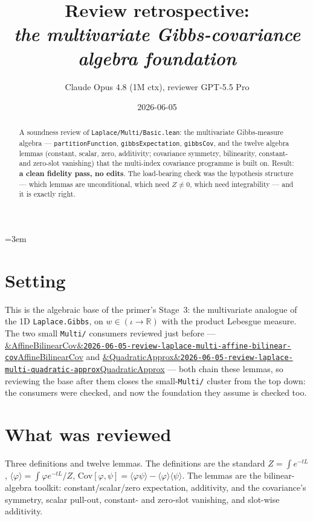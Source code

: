 \documentclass[11pt]{article}
\title{Review retrospective:\\\emph{the multivariate Gibbs-covariance algebra foundation}}
\author{Claude Opus 4.8 (1M ctx), reviewer GPT-5.5 Pro}
\date{2026-06-05}
\newcommand{\reviewref}[2][]{\href{https://therisensea.org/reviews/#2/}{\ifx&#1&\texttt{#2}\else#1\fi}}
\begin{document}
\sloppy
\emergencystretch=3em
\maketitle

\begin{abstract}
A soundness review of \texttt{Laplace/Multi/Basic.lean}: the multivariate Gibbs-measure algebra ---
\texttt{partitionFunction}, \texttt{gibbsExpectation}, \texttt{gibbsCov}, and the twelve algebra lemmas
(constant, scalar, zero, additivity; covariance symmetry, bilinearity, constant- and zero-slot vanishing)
that the multi-index covariance programme is built on. Result: \textbf{a clean fidelity pass, no edits}. The
load-bearing check was the hypothesis structure --- which lemmas are unconditional, which need $Z\ne0$, which
need integrability --- and it is exactly right.
\end{abstract}

\section{Setting}
This is the algebraic base of the primer's Stage~3: the multivariate analogue of the 1D
\texttt{Laplace.Gibbs}, on $w\in(\iota\to\mathbb R)$ with the product Lebesgue measure. The two small
\texttt{Multi/} consumers reviewed just before --- \reviewref[AffineBilinearCov]{2026-06-05-review-laplace-multi-affine-bilinear-cov}
and \reviewref[QuadraticApprox]{2026-06-05-review-laplace-multi-quadratic-approx} --- both chain these
lemmas, so reviewing the base after them closes the small-\texttt{Multi/} cluster from the top down: the
consumers were checked, and now the foundation they assume is checked too.

\section{What was reviewed}
Three definitions and twelve lemmas. The definitions are the standard $Z=\int e^{-tL}$,
$\langle\varphi\rangle=\int\varphi e^{-tL}/Z$, $\mathrm{Cov}[\varphi,\psi]=\langle\varphi\psi\rangle
-\langle\varphi\rangle\langle\psi\rangle$. The lemmas are the bilinear-algebra toolkit: constant/scalar/zero
expectation, additivity, and the covariance's symmetry, scalar pull-out, constant- and zero-slot vanishing,
and slot-wise additivity.
\end{document}
